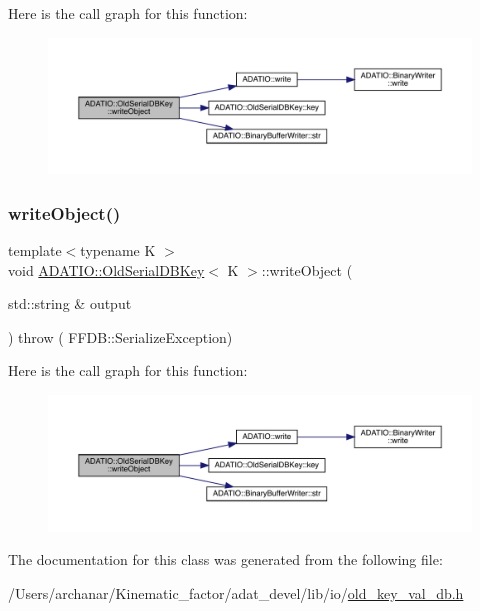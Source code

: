 Here is the call graph for this function\+:
\nopagebreak
\begin{figure}[H]
\begin{center}
\leavevmode
\includegraphics[width=350pt]{dc/d7d/classADATIO_1_1OldSerialDBKey_a4cc6346697a7bda74b9e14672cf21912_cgraph}
\end{center}
\end{figure}
\mbox{\label{classADATIO_1_1OldSerialDBKey_a4cc6346697a7bda74b9e14672cf21912}} 
\subsubsection{\texorpdfstring{writeObject()}{writeObject()}\hspace{0.1cm}{\footnotesize\ttfamily [2/2]}}
{\footnotesize\ttfamily template$<$typename K $>$ \\
void \mbox{\hyperlink{classADATIO_1_1OldSerialDBKey}{A\+D\+A\+T\+I\+O\+::\+Old\+Serial\+D\+B\+Key}}$<$ K $>$\+::write\+Object (\begin{DoxyParamCaption}\item[{std\+::string \&}]{output }\end{DoxyParamCaption}) throw ( F\+F\+D\+B\+::\+Serialize\+Exception) \hspace{0.3cm}{\ttfamily [inline]}}

Here is the call graph for this function\+:
\nopagebreak
\begin{figure}[H]
\begin{center}
\leavevmode
\includegraphics[width=350pt]{dc/d7d/classADATIO_1_1OldSerialDBKey_a4cc6346697a7bda74b9e14672cf21912_cgraph}
\end{center}
\end{figure}


The documentation for this class was generated from the following file\+:\begin{DoxyCompactItemize}
\item 
/\+Users/archanar/\+Kinematic\+\_\+factor/adat\+\_\+devel/lib/io/\mbox{\hyperlink{lib_2io_2old__key__val__db_8h}{old\+\_\+key\+\_\+val\+\_\+db.\+h}}\end{DoxyCompactItemize}
